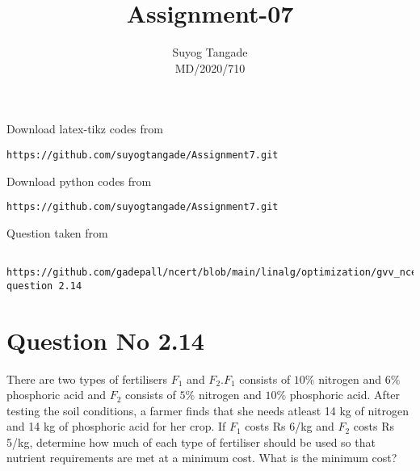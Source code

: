 \documentclass[journal,12pt,twocolumn]{IEEEtran}
\begin{document}
\makeatother
\let\StandardTheFigure\thefigure
\let\vec\mathbf
\renewcommand{\thefigure}{\theproblem}
\def\putbox#1#2#3{\makebox[0in][l]{\makebox[#1][l]{}\raisebox{\baselineskip}[0in][0in]{\raisebox{#2}[0in][0in]{#3}}}}
     \def\rightbox#1{\makebox[0in][r]{#1}}
     \def\centbox#1{\makebox[0in]{#1}}
     \def\topbox#1{\raisebox{-\baselineskip}[0in][0in]{#1}}
     \def\midbox#1{\raisebox{-0.5\baselineskip}[0in][0in]{#1}}
\vspace{3cm}
\title{Assignment-07}
\author{Suyog Tangade \\ MD/2020/710}
\maketitle
\newpage
\bigskip
\renewcommand{\thefigure}{\theenumi}
\renewcommand{\thetable}{\theenumi}
Download latex-tikz codes from
\begin{lstlisting}
https://github.com/suyogtangade/Assignment7.git
\end{lstlisting}
%
Download python codes from
\begin{lstlisting}
https://github.com/suyogtangade/Assignment7.git
\end{lstlisting}
%
Question taken from
\begin{lstlisting}
  https://github.com/gadepall/ncert/blob/main/linalg/optimization/gvv_ncert_opt.pdf question 2.14
\end{lstlisting}
\section{Question No 2.14}
 There are two types of fertilisers $F_{1}$ and $F_{2}$.$F_{1}$ consists of $10\%$ nitrogen and $6\%$
phosphoric acid and $F_{2}$ consists of $5\%$ nitrogen and $10\%$ phosphoric acid. After
testing the soil conditions, a farmer finds that she needs atleast 14 kg of nitrogen
and 14 kg of phosphoric acid for her crop. If $F_{1}$ costs Rs 6/kg and $F_{2}$ costs
Rs 5/kg, determine how much of each type of fertiliser should be used so that
nutrient requirements are met at a minimum cost. What is the minimum cost?\\
\end{document}
